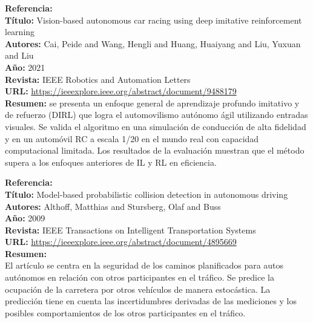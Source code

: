 \documentclass[10pt,letterpaper,final]{article}
\begin{document}
\begin{longtable}
        \newline
        \hline
        \noindent \textbf{Referencia:}~\cite{cai2021vision}                                            \\
        \textbf{Título:}
        Vision-based autonomous car racing using deep imitative reinforcement learning                 \\
        \textbf{Autores:}
        Cai, Peide and Wang, Hengli and Huang, Huaiyang and Liu, Yuxuan and Liu                        \\
        \textbf{Año:}
        2021                                                                                           \\
        \textbf{Revista:}
        IEEE Robotics and Automation Letters                                                           \\
        \textbf{URL:}
        \url{https://ieeexplore.ieee.org/abstract/document/9488179}                                    \\
        \textbf{Resumen:}
         se presenta un enfoque general de aprendizaje profundo imitativo y de refuerzo (DIRL) que logra el automovilismo
         autónomo ágil utilizando entradas visuales.
         Se valida el algoritmo en una simulación de conducción de alta fidelidad y en un automóvil RC a escala 1/20
         en el mundo real con capacidad computacional limitada.
         Los resultados de la evaluación muestran que el método supera a los enfoques anteriores de IL y RL en eficiencia.
        
        \newline
        \hline
        \noindent \textbf{Referencia:}~\cite{althoff2009model}                                         \\
        \textbf{Título:}
        Model-based probabilistic collision detection in autonomous driving                            \\
        \textbf{Autores:}
        Althoff, Matthias and Stursberg, Olaf and Buss                                                 \\
        \textbf{Año:}
        2009                                                                                           \\
        \textbf{Revista:}
        IEEE Transactions on Intelligent Transportation Systems                                        \\
        \textbf{URL:}
        \url{https://ieeexplore.ieee.org/abstract/document/4895669}                                    \\
        \textbf{Resumen:}                                                                              \\
        El artículo se centra en la seguridad de los caminos planificados para autos autónomos en relación con otros participantes en el tráfico.
        Se predice la ocupación de la carretera por otros vehículos de manera estocástica.
        La predicción tiene en cuenta las incertidumbres derivadas de las mediciones y los posibles comportamientos de los otros participantes en el tráfico.
        

\end{longtable}
\end{document}
